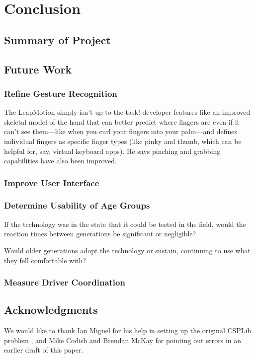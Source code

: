 \documentclass{l4proj}
\begin{document}
\chapter{Conclusion}
\label{sec:conc}
\vspace{-3mm}
\section{Summary of Project}
\vspace{-3mm}
\section{Future Work}
\vspace{-3mm}
\subsection{Refine Gesture Recognition}
\vspace{-3mm}
The LeapMotion simply isn't up to the task! developer features like an improved skeletal model of the hand that can better predict where fingers are even if it can’t see them—like when you curl your fingers into your palm—and defines individual fingers as specific finger types (like pinky and thumb, which can be helpful for, say, virtual keyboard apps). He says pinching and grabbing capabilities have also been improved. 

\subsection{Improve User Interface}
\vspace{-3mm}

\subsection{Determine Usability of Age Groups}
\vspace{-3mm}
If the technology was in the state that it could be tested in the field, would the reaction times between generations be significant or negligible?

Would older generations adopt the technology or sustain, continuing to use what they fell comfortable with?

\subsection{Measure Driver Coordination}
\vspace{-3mm}


\section*{Acknowledgments}
\label{sec:ack}
\vspace{-3mm}
We would like to thank Ian Miguel for his help in setting up the original CSPLib problem \cite{CSPLib},  and Mike Codish and Brendan McKay for pointing out errors in an earlier draft of this paper.




\end{document}
